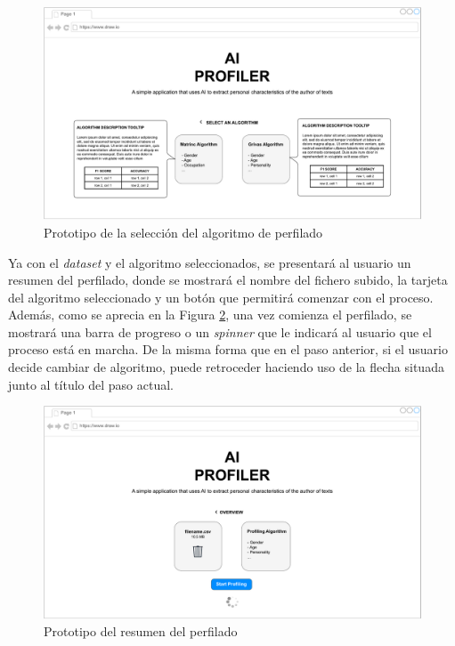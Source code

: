 \bigskip
\begin{figure}[H]
	\centering
	\includegraphics[width=\textwidth]{diagramas/landing-algorithm.pdf}
	\caption{Prototipo de la selección del algoritmo de perfilado}
	\label{fig:prototipo_algoritmo_perfilado}
\end{figure}

\bigskip
Ya con el \textit{dataset} y el algoritmo seleccionados, se presentará al usuario un resumen del perfilado, donde se mostrará
el nombre del fichero subido, la tarjeta del algoritmo seleccionado y un botón que permitirá comenzar con el proceso.
Además, como se aprecia en la Figura \ref{fig:prototipo_resumen_perfilado}, una vez comienza el perfilado, se mostrará una barra de progreso
o un \textit{spinner} que le indicará al usuario que el proceso está en marcha. De la misma forma que en el paso anterior, si el usuario
decide cambiar de algoritmo, puede retroceder haciendo uso de la flecha situada junto al título del paso actual.

\bigskip
\begin{figure}[H]
	\centering
	\includegraphics[width=\textwidth]{diagramas/landing-overview.pdf}
	\caption{Prototipo del resumen del perfilado}
	\label{fig:prototipo_resumen_perfilado}
\end{figure}

